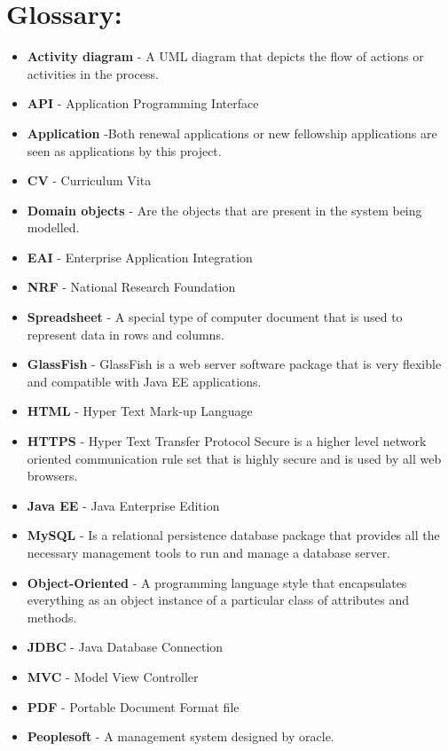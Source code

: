 \section{Glossary:}
\vspace{0.2in}

\begin{itemize}
\item \textbf{Activity diagram} - A UML diagram that depicts the flow of actions or activities in the process.
\item \textbf{API} - Application Programming Interface
\item \textbf{Application} -Both renewal applications or new fellowship applications are seen as applications by this project.
\item \textbf{CV} - Curriculum Vita
\item \textbf{Domain objects} - Are the objects that are present in the system being modelled.
\item \textbf{EAI} - Enterprise Application Integration
\item \textbf{NRF} - National Research Foundation
\item \textbf{Spreadsheet} - A special type of computer document that is used to represent data in rows and columns.
\item \textbf{GlassFish} - GlassFish is a web server software package that is very flexible and compatible with Java EE applications. 
\item \textbf{HTML} - Hyper Text Mark-up Language
\item \textbf{HTTPS} - Hyper Text Transfer Protocol Secure is a higher level network oriented communication rule set that is highly secure and is used by all web browsers. 
\item \textbf{Java EE} - Java Enterprise Edition
\item \textbf{MySQL} - Is a relational persistence database package that provides all the necessary management tools to run and manage a database server.
\item \textbf{Object-Oriented} - A programming language style that encapsulates everything as an object instance of a particular class of attributes and methods.
\item \textbf{JDBC} - Java Database Connection
\item \textbf{MVC} - Model View Controller
\item \textbf{PDF} - Portable Document Format file
\item \textbf{Peoplesoft} - A management system designed by oracle. 

\end{itemize}
